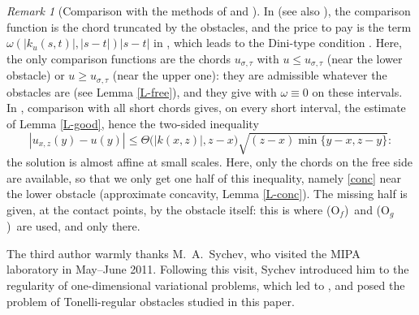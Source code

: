 \documentclass[reqno,12pt]{amsart}
\numberwithin{equation}{section}
\def\Of{{\sf (O$_f$)}}
\def\Og{{\sf (O$_g$)}}
\theoremstyle{remark}
\newtheorem{remark}[theorem]{Remark}
\begin{document}
\begin{remark}[Comparison with the methods of \cite{sychev92} and \cite{mandallena18}]
In \cite{mandallena18} (see also \cite{gratwick-sychev19}), the comparison function is the chord truncated by the obstacles, and the price to pay is the term $\omega(|k_u(s,t)|,|s-t|)|s-t|$ in \cite[(A$_3$)]{mandallena18}, which leads to the Dini-type condition \cite[(1.2)]{mandallena18}. Here, the only comparison functions are the chords $u_{\sigma,\tau}$ with $u\leq u_{\sigma,\tau}$ (near the lower obstacle) or $u\geq u_{\sigma,\tau}$ (near the upper one): they are admissible whatever the obstacles are (see Lemma \ref{L-free}), and they give \cite[(A$_3$)]{mandallena18} with $\omega\equiv0$ on these intervals. In \cite{sychev92}, comparison with all short chords gives, on every short interval, the estimate of Lemma \ref{L-good}, hence the two-sided inequality
\begin{equation*}
|u_{x,z}(y)-u(y)|\leq\Theta\big(|k(x,z)|,z-x\big)\sqrt{(z-x)\min\{y-x,z-y\}}:
\end{equation*}
the solution is almost affine at small scales. Here, only the chords on the free side are available, so that we only get one half of this inequality, namely \eqref{conc} near the lower obstacle (approximate concavity, Lemma \ref{L-conc}). The missing half is given, at the contact points, by the obstacle itself: this is where \Of\ and \Og\ are used, and only there.
\end{remark}

\medskip

 The third author warmly thanks M.~A.~Sychev, who visited the MIPA laboratory in May--June 2011. Following this visit, Sychev introduced him to the regularity of one-dimensional variational problems, which led to \cite{mandallena18,mandallena19}, and posed the problem of Tonelli-regular obstacles studied in this paper.
\end{document}

